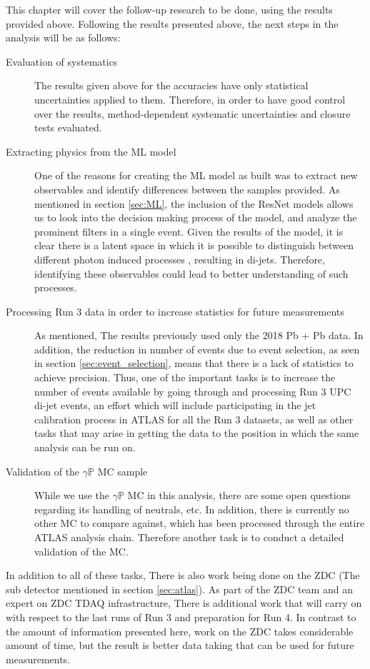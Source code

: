 This chapter will cover the follow-up research to be done, using the results provided above. Following the results presented above, the next steps in the analysis will be as follows:

\begin{description}
\item [ Evaluation of systematics ] The results given above for the accuracies have only statistical uncertainties applied to them. Therefore, in order to have good control over the results, method-dependent systematic uncertainties and closure tests evaluated.

\item [Extracting physics from the ML model] One of the reasons for creating the ML model as built was to extract new observables and identify differences between the samples provided. As mentioned in section \ref{sec:ML}, the inclusion of the ResNet models allows us to look into the decision making process of the model, and analyze the prominent filters in a single event. Given the results of the model, it is clear there is a latent space in which it is possible to distinguish between different photon induced processes , resulting in di-jets. Therefore, identifying these observables could lead to better understanding of such processes.

\item [Processing Run 3 data in order to increase statistics for future measurements] As mentioned, The results previously used only the 2018 Pb + Pb data. In addition, the reduction in number of events due to event selection, as seen in section \ref{sec:event_selection}, means that there is a lack of statistics to achieve precision. Thus, one of the important tasks is to increase the number of events available by going through and processing Run 3 UPC di-jet events, an effort which will include participating in the jet calibration process in ATLAS for all the Run 3 datasets, as well as other tasks that may arise in getting the data to the position in which the same analysis can be run on.

\item [Validation of the $\gamma \mathbb{P}$ MC sample] While we use the $\gamma \mathbb{P}$ MC in this analysis, there are some open questions regarding its handling of neutrals, etc. In addition, there is currently no other MC to compare against, which has been processed through the entire ATLAS analysis chain. Therefore another task is to conduct a detailed validation of the MC.
\end{description}


In addition to all of these tasks, There is also work being done on the ZDC (The sub detector mentioned in section \ref{sec:atlas}). As part of the ZDC team and an expert on ZDC TDAQ infrastructure, There is additional work that will carry on with respect to the last runs of Run 3 and preparation for Run 4. In contrast to the amount of information presented here, work on the ZDC takes considerable amount of time, but the result is better data taking that can be used for future measurements.

